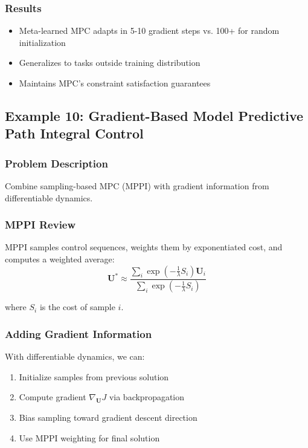 \subsubsection{Results}

\begin{itemize}
    \item Meta-learned MPC adapts in 5-10 gradient steps vs. 100+ for random initialization
    \item Generalizes to tasks outside training distribution
    \item Maintains MPC's constraint satisfaction guarantees
\end{itemize}

\subsection{Example 10: Gradient-Based Model Predictive Path Integral Control}

\subsubsection{Problem Description}

Combine sampling-based MPC (MPPI) with gradient information from differentiable dynamics.

\subsubsection{MPPI Review}

MPPI samples control sequences, weights them by exponentiated cost, and computes a weighted average:
\begin{equation}
\mathbf{U}^* \approx \frac{\sum_i \exp(-\frac{1}{\lambda} S_i) \mathbf{U}_i}{\sum_i \exp(-\frac{1}{\lambda} S_i)}
\end{equation}

where $S_i$ is the cost of sample $i$.

\subsubsection{Adding Gradient Information}

With differentiable dynamics, we can:
\begin{enumerate}
    \item Initialize samples from previous solution
    \item Compute gradient $\nabla_{\mathbf{U}} J$ via backpropagation
    \item Bias sampling toward gradient descent direction
    \item Use MPPI weighting for final solution
\end{enumerate}

